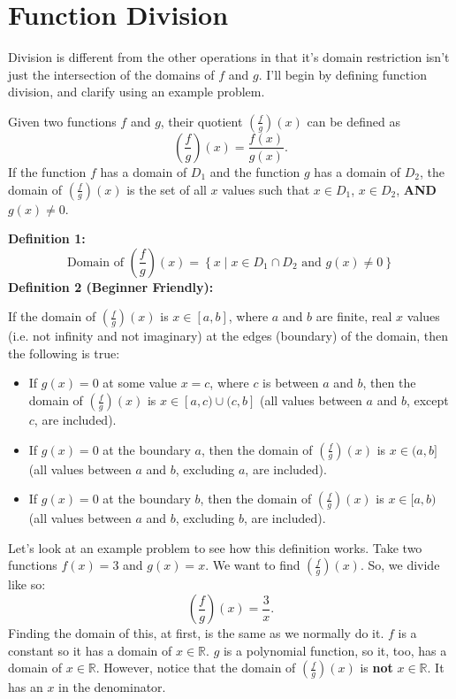 \clearpage\section{Function Division}
Division is different from the other operations in that it's domain restriction isn't just the intersection of the domains of $f$ and $g$. I'll begin by defining function division, and clarify using an example problem.
\begin{definition}
Given two functions $f$ and $g$, their quotient $\left(\frac{f}{g} \right)(x)$ can be defined as
\[
\left(\frac{f}{g} \right)(x) = \frac{f(x)}{g(x)} \text{.}
\]
If the function $f$ has a domain of $D_1$ and the function $g$ has a domain of $D_2$, the domain of $\left(\frac{f}{g} \right)(x)$ is the set of all $x$ values such that $x \in D_1$, $x \in D_2$, \textbf{AND} $g(x) \neq 0$.

\textbf{Definition 1:}
\[
\text{Domain of } \left(\frac{f}{g} \right)(x) = \left\{x \mid x \in D_1 \cap D_2 \text{ and } g(x) \neq 0 \right\}
\]
\textbf{Definition 2 (Beginner Friendly):}

If the domain of $\left(\frac{f}{g} \right)(x)$ is $x \in [a,b]$, where $a$ and $b$ are finite, real $x$ values (i.e. not infinity and not imaginary) at the edges (boundary) of the domain, then the following is true:
\begin{itemize}
    \item If $g(x) = 0$ at some value $x = c$, where $c$ is between $a$ and $b$, then the domain of $\left(\frac{f}{g} \right)(x)$ is $x \in [a, c)\cup(c, b]$ (all values between $a$ and $b$, except $c$, are included).
    \item If $g(x) = 0$ at the boundary $a$, then the domain of $\left(\frac{f}{g} \right)(x)$ is $x \in (a, b]$ (all values between $a$ and $b$, excluding $a$, are included). 
    \item If $g(x) = 0$ at the boundary $b$, then the domain of $\left(\frac{f}{g} \right)(x)$ is $x \in [a, b)$ (all values between $a$ and $b$, excluding $b$, are included). 
\end{itemize}
\end{definition}\clearpage
Let's look at an example problem to see how this definition works. Take two functions $f(x) = 3$ and $g(x) = x$. We want to find $\left(\frac{f}{g} \right)(x)$. So, we divide like so:
\[
\left(\frac{f}{g} \right)(x) = \frac{3}{x} \text{.}
\]
Finding the domain of this, at first, is the same as we normally do it. $f$ is a constant so it has a domain of $x \in \mathbb{R}$. $g$ is a polynomial function, so it, too, has a domain of $x \in \mathbb{R}$. However, notice that the domain of $\left(\frac{f}{g} \right)(x)$ is \textbf{not} $x \in \mathbb{R}$. It has an $x$ in the denominator. 

